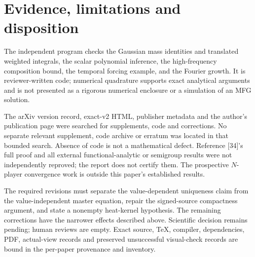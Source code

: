 \documentclass[10pt]{article}
\begin{document}
\section*{Evidence, limitations and disposition}
The independent program checks the Gaussian mass identities and translated weighted integrals, the scalar polynomial inference, the high-frequency composition bound, the temporal forcing example, and the Fourier growth. It is reviewer-written code; numerical quadrature supports exact analytical arguments and is not presented as a rigorous numerical enclosure or a simulation of an MFG solution.\par
The arXiv version record, exact-v2 HTML, publisher metadata and the author’s publication page were searched for supplements, code and corrections. No separate relevant supplement, code archive or erratum was located in that bounded search. Absence of code is not a mathematical defect. Reference [34]’s full proof and all external functional-analytic or semigroup results were not independently reproved; the report does not certify them. The prospective \(N\)-player convergence work is outside this paper’s established results.\par
The required revisions must separate the value-dependent uniqueness claim from the value-independent master equation, repair the signed-source compactness argument, and state a nonempty heat-kernel hypothesis. The remaining corrections have the narrower effects described above. Scientific decision remains pending; human reviews are empty. Exact source, TeX, compiler, dependencies, PDF, actual-view records and preserved unsuccessful visual-check records are bound in the per-paper provenance and inventory.\par
\end{document}
